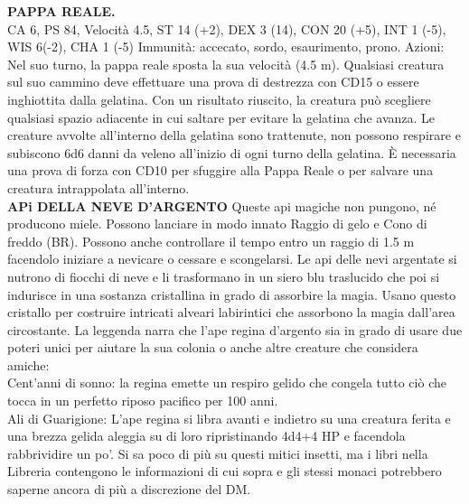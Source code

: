 \documentclass{article}
\begin{document}
    \textbf{PAPPA REALE.}\\
    CA 6, PS 84, Velocità 4.5, ST 14 (+2), DEX 3 (14),
    CON 20 (+5), INT 1 (-5), WIS 6(-2), CHA 1 (-5)
    Immunità: accecato, sordo, esaurimento, prono.
    Azioni: Nel suo turno, la pappa reale sposta la sua velocità (4.5 m). Qualsiasi creatura sul suo cammino deve effettuare una prova di destrezza con CD15 o essere inghiottita dalla gelatina. Con un risultato riuscito, la creatura può scegliere qualsiasi spazio adiacente in cui saltare per evitare la gelatina che avanza.
    Le creature avvolte all'interno della gelatina sono trattenute, non possono respirare e subiscono 6d6 danni da veleno all'inizio di ogni turno della gelatina.
    È necessaria una prova di forza con CD10 per sfuggire alla Pappa Reale o per salvare una creatura intrappolata all'interno.
    \\
    \textbf{APi DELLA NEVE D'ARGENTO}
    Queste api magiche non pungono, né producono miele. Possono lanciare in modo innato Raggio di gelo e Cono di freddo (BR).
Possono anche controllare il tempo entro un raggio di 1.5 m facendolo iniziare a nevicare o cessare e scongelarsi.
Le api delle nevi argentate si nutrono di fiocchi di neve e li trasformano in un siero blu traslucido che poi si indurisce in una sostanza cristallina in grado di assorbire la magia. Usano questo cristallo per costruire intricati alveari labirintici che assorbono la magia dall'area circostante.
La leggenda narra che l'ape regina d'argento sia in grado di usare due poteri unici per aiutare la sua colonia o anche altre creature che considera amiche:
\\Cent'anni di sonno: la regina emette un respiro gelido che congela tutto ciò che tocca in un perfetto riposo pacifico per 100 anni.
\\Ali di Guarigione: L'ape regina si libra avanti e indietro su una creatura ferita e una brezza gelida aleggia su di loro ripristinando 4d4+4 HP e facendola rabbrividire un po'.
Si sa poco di più su questi mitici insetti, ma i libri nella Libreria contengono le informazioni di cui sopra e gli stessi monaci potrebbero saperne ancora di più a discrezione del DM.
\end{document}
